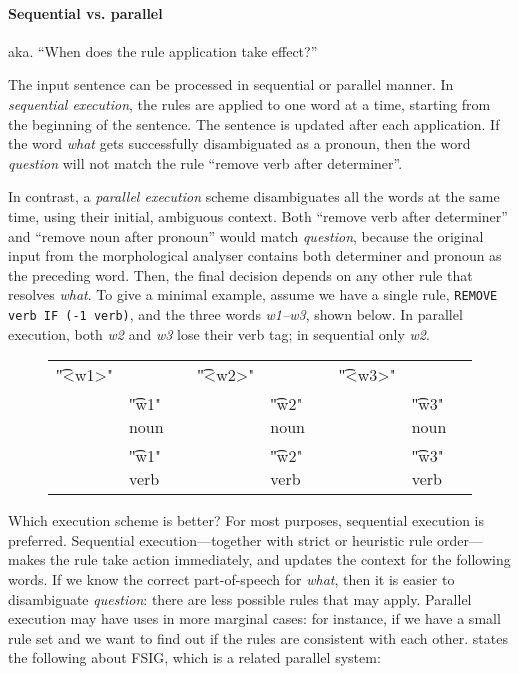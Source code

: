 \paragraph{Sequential vs. parallel}

aka. ``When does the rule application take effect?''

The input sentence can be processed in sequential or parallel manner.
In \emph{sequential execution}, the rules are applied to one word at a time, starting from the beginning of the sentence. The sentence is updated after each application. If the word \emph{what} gets successfully disambiguated as a pronoun, then the word \emph{question} will not match the rule ``remove verb after determiner''.


In contrast, a \emph{parallel execution} scheme disambiguates all the words at the same 
time, using their initial, ambiguous context. Both ``remove verb after determiner'' and 
``remove noun after pronoun'' would match \emph{question}, because the original 
input from the morphological analyser contains both determiner and pronoun as the 
preceding word. Then, the final decision depends on any other rule that resolves \emph{what}.
To give a minimal example, assume we have a single rule, \texttt{REMOVE verb IF (-1 verb)}, and the three words \emph{w1--w3}, shown below. 
In parallel execution, both \emph{w2} and \emph{w3} lose their verb tag; in sequential only \emph{w2}.


\begin{figure}[h]
\begin{tabular}{p{0.5cm} l   p{0.5cm} l    p{0.5cm} l}
\t{"<w1>"}      &  & \t{"<w2>"}    & & \t{"<w3>"}      & \\
   & \t{"w1" noun} & & \t{"w2" noun} & & \t{"w3" noun}   \\
   & \t{"w1" verb} & & \t{"w2" verb} & & \t{"w3" verb} 

\end{tabular}
\end{figure}

Which execution scheme is better? For most purposes, sequential execution is preferred.  Sequential execution–--together with strict or heuristic rule order---makes the rule take action immediately, and updates the context for the following words. 
If we know the correct part-of-speech for \emph{what}, then it is easier to disambiguate \emph{question}: there are less possible rules that may apply. 
Parallel execution may have uses in more marginal cases: for instance, if we have a small rule set and we want to find out if the rules are consistent with each other.
\cite{koskenniemi90} states the following about FSIG, which is a related parallel system:

